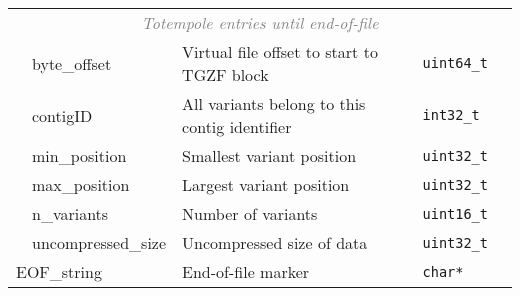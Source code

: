 \documentclass[10pt]{article}
\begin{document}
\begin{table}[H]
{\begin{tabular}{|l|l|l|l|r|}
  \multicolumn{5}{|c|}{\textcolor{gray}{\it Totempole entries until end-of-file}} \\\cline{2-5}
  & {\sf byte\_offset} & Virtual file offset to start to TGZF block & {\tt uint64\_t} & \\\cline{2-5}
  & {\sf contigID} & All variants belong to this contig identifier & {\tt int32\_t} & \\\cline{2-5}
    & {\sf min\_position} & Smallest variant position & {\tt uint32\_t} & \\\cline{2-5}
  & {\sf max\_position} & Largest variant position & {\tt uint32\_t} & \\\cline{2-5}
    & {\sf n\_variants} & Number of variants & {\tt uint16\_t} & \\\cline{2-5}
  & {\sf uncompressed\_size} & Uncompressed size of data & {\tt uint32\_t} & \\\cline{2-5}
  \hline
  \multicolumn{2}{|l|}{\sf EOF\_string} & End-of-file marker & {\tt char*} & \\\cline{1-5}
\end{tabular}}
\end{table}
\end{document}
